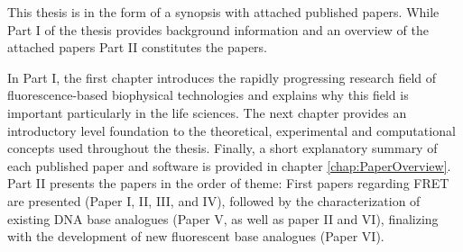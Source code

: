  This thesis is in the form of a synopsis with attached published papers. While Part I of the thesis provides background information and an overview of the attached papers Part II constitutes the papers.

 In Part I, the first chapter introduces the rapidly progressing research field of fluorescence-based biophysical technologies and explains why this field is important particularly in the life sciences. The next chapter provides an introductory level foundation to the theoretical, experimental and computational concepts used throughout the thesis. Finally, a short explanatory summary of each published paper and software is provided in chapter \ref{chap:PaperOverview}. Part II presents the papers in the order of theme: First papers regarding FRET are presented (Paper I, II, III, and IV), followed by the characterization of existing DNA base analogues (Paper V, as well as paper II and VI), finalizing with the development of new fluorescent base analogues (Paper VI).
